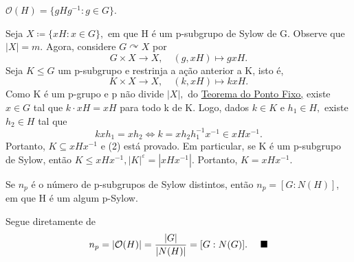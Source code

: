 \documentclass[Algebra/algebra_notes.tex]{subfiles}
\begin{document}
\(\mathcal{O}(H) = \{gHg^{-1}: g\in G\}\).
\begin{proof*}
	Seja \(X\coloneqq \{xH: x\in G\},\) em que H é um p-subgrupo de Sylow de G. Observe que
	\(|X| = m.\) Agora, considere \(G \curvearrowright X\) por
	\[
		G\times X\rightarrow X,\quad (g, xH)\mapsto gxH.
	\]
	Seja \(K\leq G\) um p-subgrupo e restrinja a ação anterior a K, isto é,
	\[
		K\times X\rightarrow X,\quad (k, xH)\mapsto kxH.
	\]
	Como K é um p-grupo e p não divide \(|X|,\) do \hyperlink{fixed_point}{Teorema do Ponto Fixo,} existe
	\(x\in G\) tal que \(k \cdot xH = xH\) para todo k de K. Logo, dados \(k\in K\) e
	\(h_{1}\in H,\) existe \(h_{2}\in H\) tal que
	\[
		kxh_{1} = xh_{2} \Longleftrightarrow k = xh_{2}h_{1}^{-1}x^{-1}\in xHx^{-1}.
	\]
	Portanto, \(K\subseteq{xHx^{-1}}\) e (2) está provado. Em particular, se K é um p-subgrupo de Sylow,
	então \(K\leq xHx^{-1}, |K|^{\varepsilon } = |xHx^{-1}|\). Portanto, \(K = xHx^{-1}.\) \qedsymbol
\end{proof*}
\begin{crl*}
	Se \(n_{p}\) é o número de p-subgrupos de Sylow distintos, então \(n_{p} = [G:N(H)]\), em
	que H é um algum p-Sylow.
\end{crl*}
\begin{proof*}
	Segue diretamente de
	\[
		n_{p} = |\mathcal{O}(H)| = \frac{|G|}{|N(H)|} = [G:N(G)].\quad\text{ $\blacksquare$}
	\]
\end{proof*}
\end{document}
